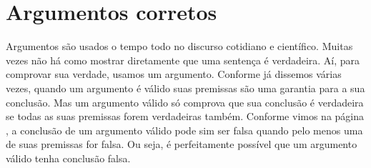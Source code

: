 

\section{Argumentos corretos}
Argumentos são usados o tempo todo no discurso cotidiano e científico.
Muitas vezes não há como mostrar diretamente que uma sentença é verdadeira.
Aí, para comprovar sua verdade, usamos um argumento.
Conforme já dissemos várias vezes, quando um argumento é válido suas premissas são uma garantia para a sua conclusão.
Mas um argumento válido só comprova que sua conclusão é verdadeira se todas as suas premissas forem verdadeiras também.
Conforme vimos na página \pageref{premissafalsa}, a conclusão de um argumento válido pode sim ser falsa quando pelo menos uma de suas premissas for falsa.
Ou seja, é perfeitamente possível que um argumento válido tenha conclusão falsa.

